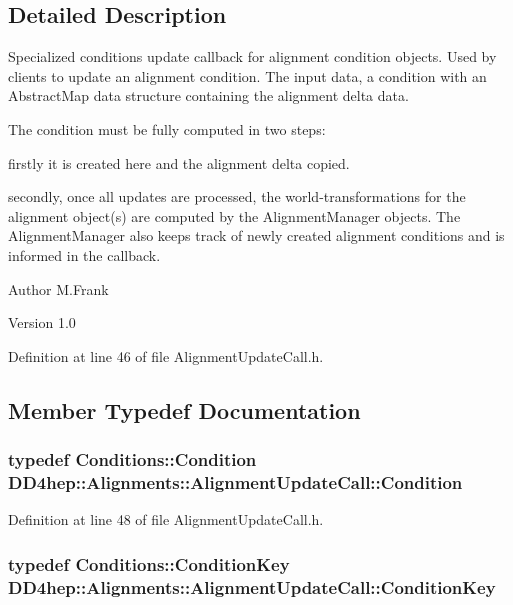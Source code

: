\subsection{Detailed Description}
Specialized conditions update callback for alignment condition objects. Used by clients to update an alignment condition. The input data, a condition with an AbstractMap data structure containing the alignment delta data.

The condition must be fully computed in two steps:
\begin{DoxyItemize}
\item firstly it is created here and the alignment delta copied.
\item secondly, once all updates are processed, the world-\/transformations for the alignment object(s) are computed by the AlignmentManager objects. The AlignmentManager also keeps track of newly created alignment conditions and is informed in the callback.
\end{DoxyItemize}

\begin{DoxyAuthor}{Author}
M.Frank 
\end{DoxyAuthor}
\begin{DoxyVersion}{Version}
1.0 
\end{DoxyVersion}


Definition at line 46 of file AlignmentUpdateCall.h.

\subsection{Member Typedef Documentation}
\hypertarget{class_d_d4hep_1_1_alignments_1_1_alignment_update_call_ac41c367dd7b7027a76d7b691223927fd}{
\subsubsection[{Condition}]{\setlength{\rightskip}{0pt plus 5cm}typedef {\bf Conditions::Condition} {\bf DD4hep::Alignments::AlignmentUpdateCall::Condition}}}
\label{class_d_d4hep_1_1_alignments_1_1_alignment_update_call_ac41c367dd7b7027a76d7b691223927fd}


Definition at line 48 of file AlignmentUpdateCall.h.\hypertarget{class_d_d4hep_1_1_alignments_1_1_alignment_update_call_a3c759edb169218bd8bc3b1c15d8af2e0}{
\subsubsection[{ConditionKey}]{\setlength{\rightskip}{0pt plus 5cm}typedef {\bf Conditions::ConditionKey} {\bf DD4hep::Alignments::AlignmentUpdateCall::ConditionKey}}}
\label{class_d_d4hep_1_1_alignments_1_1_alignment_update_call_a3c759edb169218bd8bc3b1c15d8af2e0}


